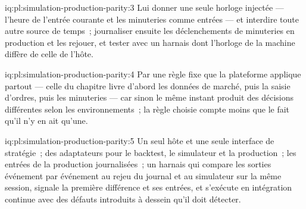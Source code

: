 \begin{solution}{iq:pl:simulation-production-parity:3}
Lui donner une seule horloge injectée --- l'heure de l'entrée courante et les minuteries comme entrées --- et interdire toute autre source de temps~; journaliser ensuite les
déclenchements de minuteries en production et les rejouer, et tester avec un harnais dont l'horloge de la machine diffère de celle de l'hôte.
\end{solution}

\begin{solution}{iq:pl:simulation-production-parity:4}
Par une règle fixe que la plateforme applique partout --- celle du chapitre livre d'abord les données de marché, puis la saisie d'ordres, puis les minuteries --- car
sinon le même instant produit des décisions différentes selon les environnements~; la règle choisie compte moins que le fait qu'il n'y en ait qu'une.
\end{solution}

\begin{solution}{iq:pl:simulation-production-parity:5}
Un seul hôte et une seule interface de stratégie~; des adaptateurs pour le backtest, le simulateur et la production~; les entrées de la production journalisées~; un harnais qui
compare les sorties événement par événement au rejeu du journal et au simulateur sur la même session, signale la première
différence et ses entrées, et s'exécute en intégration continue avec des défauts introduits à dessein qu'il doit détecter.
\end{solution}
